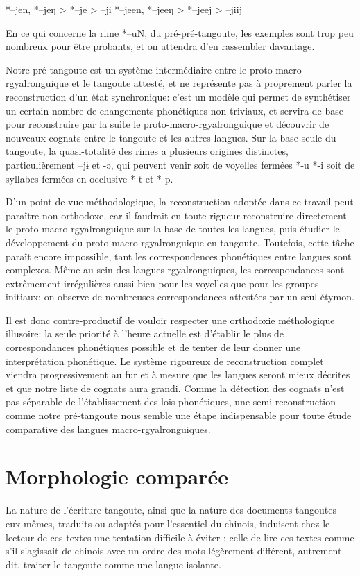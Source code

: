 \documentclass[oldfontcommands,twoside,a4paper,11pt,draft]{memoir}
\newcommand{\ipapl}[1]{{\phondroit #1}}
\begin{document}
*--\ipapl{jen}, *--\ipapl{jeŋ} > *--\ipapl{je} > --\ipapl{ji} 
\newline
*--\ipapl{jeen}, *--\ipapl{jeeŋ} > *--\ipapl{jeej} > --\ipapl{jiij} 
\newline


En ce qui concerne la rime *--\ipapl{uN}, du pré-pré-tangoute, les exemples sont trop peu nombreux pour être probants, et on attendra d'en rassembler davantage.


Notre pré-tangoute est un système intermédiaire entre le proto-macro-rgyalronguique et le tangoute attesté, et ne représente pas à proprement parler la reconstruction d'un état synchronique: c'est un modèle qui permet de synthétiser un certain nombre de changements phonétiques non-triviaux, et servira de base pour reconstruire par la suite le proto-macro-rgyalronguique et découvrir de nouveaux cognats entre le tangoute et les autres langues. Sur la base seule du tangoute, la quasi-totalité des rimes a plusieurs origines distinctes, particulièrement --jɨ et -ə, qui peuvent venir soit de voyelles fermées *-u *-i soit de syllabes fermées en occlusive *-t et *-p. 

D'un point de vue méthodologique, la reconstruction adoptée dans ce travail peut paraître non-orthodoxe, car il faudrait en toute rigueur reconstruire directement le proto-macro-rgyalronguique sur la base de toutes les langues, puis étudier le développement du proto-macro-rgyalronguique en tangoute. Toutefois, cette tâche paraît encore impossible, tant les correspondences phonétiques entre langues sont complexes. Même au sein des langues rgyalronguiques, les correspondances sont extrêmement irrégulières aussi bien pour les voyelles que pour les groupes initiaux: on observe de nombreuses correspondances attestées par un seul étymon. 

Il est donc contre-productif de vouloir respecter une orthodoxie méthologique illusoire: la seule priorité à l'heure actuelle est d'établir le plus de correspondances phonétiques possible et de tenter de leur donner une interprétation phonétique. Le système rigoureux de reconstruction complet viendra progressivement au fur et à mesure que les langues seront mieux décrites et que notre liste de cognats aura grandi. Comme la détection des cognats n'est pas séparable de l'établissement des lois phonétiques, une semi-reconstruction comme notre pré-tangoute nous semble une étape indispensable pour toute étude comparative des langues macro-rgyalronguiques.


\chapter{Morphologie comparée}
\thispagestyle{empty}
La nature de l'écriture tangoute, ainsi que la nature des documents tangoutes eux-mêmes, traduits ou adaptés pour l'essentiel du chinois, induisent chez le lecteur de ces textes une tentation difficile à éviter : celle de lire ces textes comme s'il s'agissait de chinois avec un ordre des mots légèrement différent, autrement dit, traiter le tangoute comme une langue isolante. 
\end{document}
